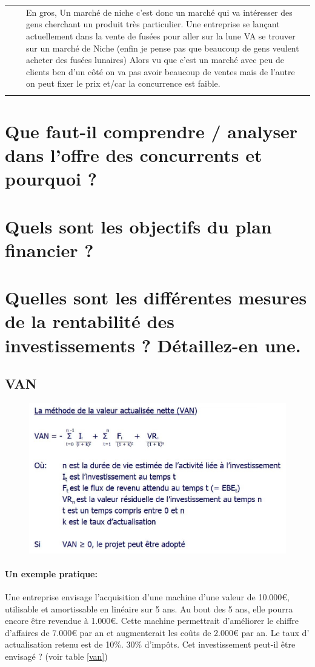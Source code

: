 \documentclass{article}
\begin{document}
\begin{tabular}{|rcl|}
				 &  & \multicolumn{1}{p{.8\textwidth}|}{En gros, Un marché de niche c'est donc un marché qui va intéresser des gens cherchant un produit très particulier. Une entreprise se lançant actuellement dans la vente de fusées pour aller sur la lune VA se trouver sur un marché de Niche (enfin je pense pas que beaucoup de gens veulent acheter des fusées lunaires) Alors vu que c'est un marché avec peu de clients ben d'un côté on va pas avoir beaucoup de ventes mais de l'autre on peut fixer le prix et/car la concurrence est faible.}\\
&&\\
\hline
\end{tabular}
\section{Que faut-il comprendre / analyser dans l’offre des concurrents et pourquoi ?} %
\section{Quels sont les objectifs du plan financier ?} %


\section{Quelles sont les différentes mesures de la rentabilité des investissements ? Détaillez-en une.}
\subsection{VAN}
\begin{figure}[H]
	\centering
	\includegraphics[width=14cm]{van.jpg}
\end{figure}

\paragraph{Un exemple pratique:}
Une entreprise envisage l’acquisition d’une machine d’une valeur de 10.000\euro{}, utilisable et amortissable en linéaire sur 5 ans.
Au bout des 5 ans, elle pourra encore être revendue à 1.000\euro{}.
Cette machine permettrait d’améliorer le chiffre d’affaires de 7.000\euro{} par an et augmenterait les coûts de 2.000\euro{} par an. Le taux d’ actualisation retenu est de
10\%. 30\% d’impôts. Cet investissement peut-il être envisagé ? (voir table \ref{van})
\end{document}
